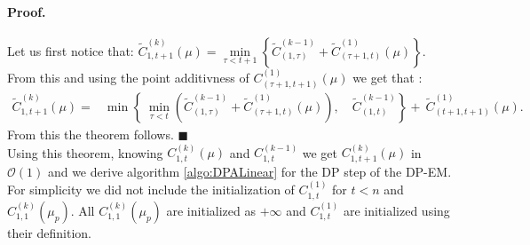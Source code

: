 \documentclass[article,10pt]{llncs}
\begin{document}
\paragraph{Proof. } Let us first notice that: 
$ \widetilde{C}_{1, t+1}^{(k)}(\mu) =  \underset{{\tau < t+1} }{\min}\left\{  \widetilde{C}_{(1,\tau)}^{(k-1)}  +  \widetilde{C}_{(\tau+1, t)}^{(1)}(\mu) \right\}
.$
From this and using the point additivness of $ C_{(\tau+1, t+1)}^{(1)}(\mu)$ we get that :
\begin{eqnarray*}
 \widetilde{C}_{1, t+1}^{(k)}(\mu) = & \min \left\{ \ \underset{{\tau < t}}{\min} \left(  \widetilde{C}_{(1,\tau)}^{(k-1)}  +  \widetilde{C}_{(\tau+1, t)}^{(1)}(\mu) \right), \quad  \widetilde{C}_{(1,t)}^{(k-1)}  \right\} +  \ \widetilde{C}_{(t+1, t+1)}^{(1)}(\mu).
\end{eqnarray*}
\noindent From this the theorem follows. $\blacksquare$ \\

Using this theorem, knowing $C_{1, t}^{(k)}(\mu)$ and $C_{1, t}^{(k-1)}$ we get $C_{1, t+1}^{(k)}(\mu)$ in $\mathcal{O}(1)$
and we derive algorithm \ref{algo:DPALinear} for the DP step of the DP-EM.
For simplicity we did not include the initialization of $C^{(1)}_{1,t}$ for $t < n$ and $C^{(k)}_{1,1}(\mu_p)$.
All $C^{(k)}_{1,1}(\mu_p)$ are initialized as $+\infty$ and $C^{(1)}_{1,t}$ are initialized using their definition.
\end{document}
